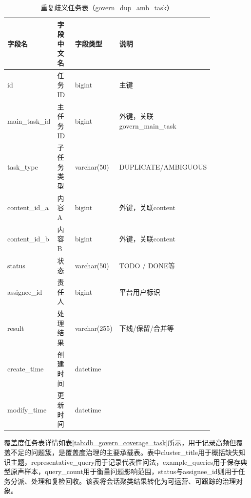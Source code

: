 \begin{table}[!htbp]
  \centering
  \caption{重复歧义任务表（govern\_dup\_amb\_task）}
  \label{tab:db_govern_dup_amb_task}
  \small
  \begin{tabular}{>{\raggedright\arraybackslash}p{0.20\linewidth}|>{\raggedright\arraybackslash}p{0.16\linewidth}|>{\raggedright\arraybackslash}p{0.16\linewidth}|>{\raggedright\arraybackslash}p{0.32\linewidth}}
    \hline
    字段名 & 字段中文名 & 字段类型 & 说明 \\ \hline
    id & 任务ID & bigint & 主键 \\ \hline
    main\_task\_id & 主任务ID & bigint & 外键，关联govern\_main\_task \\ \hline
    task\_type & 子任务类型 & varchar(50) & DUPLICATE/AMBIGUOUS \\ \hline
    content\_id\_a & 内容A & bigint & 外键，关联content \\ \hline
    content\_id\_b & 内容B & bigint & 外键，关联content \\ \hline
    status & 状态 & varchar(50) & TODO / DONE等 \\ \hline
    assignee\_id & 责任人 & bigint & 平台用户标识 \\ \hline
    result & 处理结果 & varchar(255) & 下线/保留/合并等 \\ \hline
    create\_time & 创建时间 & datetime & \\ \hline
    modify\_time & 更新时间 & datetime & \\ \hline
  \end{tabular}
\end{table}

覆盖度任务表详情如表\ref{tab:db_govern_coverage_task}所示，用于记录高频但覆盖不足的问题簇，是覆盖度治理的主要承载表。表中cluster\_\allowbreak title用于概括缺失知识主题，representative\_\allowbreak query用于记录代表性问法，example\_\allowbreak queries用于保存典型原声样本，query\_\allowbreak count用于衡量问题影响范围，status与assignee\_\allowbreak id则用于任务分派、处理和复检回收。该表将会话聚类结果转化为可运营、可跟踪的治理对象。

